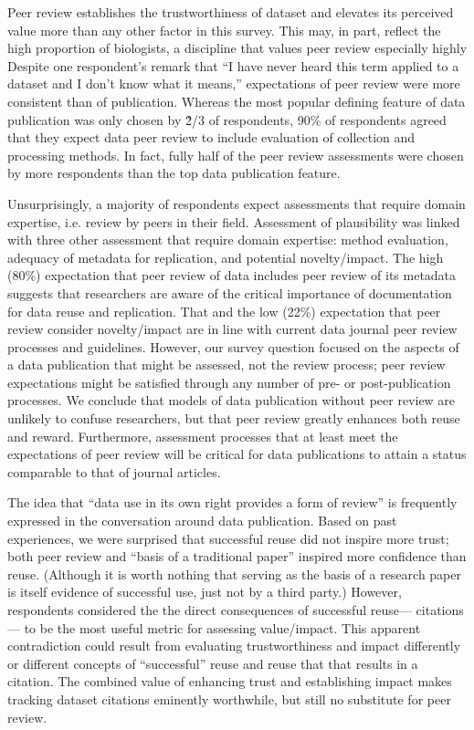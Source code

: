 \documentclass[10pt]{article}
\begin{document}
Peer review establishes the trustworthiness of dataset and elevates its perceived value more than any other factor in this survey.
This may, in part, reflect the high proportion of biologists, a discipline that values peer review especially highly\cite{harley_assessing_2010} %
Despite one respondent's remark that ``I have never heard this term applied to a dataset and I don't know what it means,'' expectations of peer review were more consistent than of publication. 
Whereas the most popular defining feature of data publication was only chosen by \~2/3 of respondents, 90\% of respondents agreed that they expect data peer review to include evaluation of collection and processing methods.
In fact, fully half of the peer review assessments were chosen by more respondents than the top data publication feature.

Unsurprisingly, a majority of respondents expect assessments that require domain expertise, i.e. review by peers in their field.
Assessment of plausibility was linked with three other assessment that require domain expertise: method evaluation, adequacy of metadata for replication, and potential novelty/impact.
The high (80\%) expectation that peer review of data includes peer review of its metadata suggests that researchers are aware of the critical importance of documentation for data reuse and replication.
That and the low (22\%) expectation that peer review consider novelty/impact are in line with current data journal peer review processes and guidelines\cite{kratz_data_2014}.
However, our survey question focused on the aspects of a data publication that might be assessed, not the review process; peer review expectations might be satisfied through any number of pre- or post-publication processes.
We conclude that models of data publication without peer review are unlikely to confuse researchers, but that peer review greatly enhances both reuse and reward.
Furthermore, assessment processes that at least meet the expectations of peer review will be critical for data publications to attain a status comparable to that of journal articles.

The idea that ``data use in its own right provides a form of review''\cite{parsons_data_2010} is frequently expressed in the conversation around data publication. 
Based on past experiences, we were surprised that successful reuse did not inspire more trust; both peer review and ``basis of a traditional paper'' inspired more confidence than reuse.
(Although it is worth nothing that serving as the basis of a research paper is itself evidence of successful use, just not by a third party.)
However, respondents considered the the direct consequences of successful reuse--- citations--- to be the most useful metric for assessing value/impact.
This apparent contradiction could result from evaluating trustworthiness and impact differently or different concepts of  ``successful'' reuse and reuse that that results in a citation.
The combined value of enhancing trust and establishing impact makes tracking dataset citations eminently worthwhile, but still no substitute for peer review.
\end{document}
